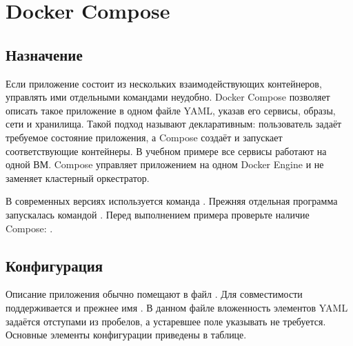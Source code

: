 \chapter{Docker Compose}
\label{ch:22-docker-compose}
\begingroup
\setlength{\parskip}{0pt}
\setlength{\parindent}{1.25cm}
\makeatletter
\let\@afterindentfalse\@afterindenttrue
\@afterindenttrue
\makeatother
\setlength{\intextsep}{8pt plus 2pt minus 2pt}
\setlength{\textfloatsep}{10pt plus 2pt minus 2pt}
\raggedbottom
{}
\captionsetup[figure]{font=footnotesize,justification=centering,singlelinecheck=false}

\section{Назначение}

Если приложение состоит из нескольких взаимодействующих контейнеров, управлять ими отдельными командами неудобно. Docker Compose позволяет описать такое приложение в одном файле YAML, указав его сервисы, образы, сети и хранилища. Такой подход называют декларативным: пользователь задаёт требуемое состояние приложения, а Compose создаёт и запускает соответствующие контейнеры. В учебном примере все сервисы работают на одной ВМ. Compose управляет приложением на одном Docker Engine и не заменяет кластерный оркестратор.

В современных версиях используется команда . Прежняя отдельная программа запускалась командой . Перед выполнением примера проверьте наличие Compose: .

\section{Конфигурация}

Описание приложения обычно помещают в файл . Для совместимости поддерживается и прежнее имя . В данном файле вложенность элементов YAML задаётся отступами из пробелов, а устаревшее поле  указывать не требуется. Основные элементы конфигурации приведены в таблице.

